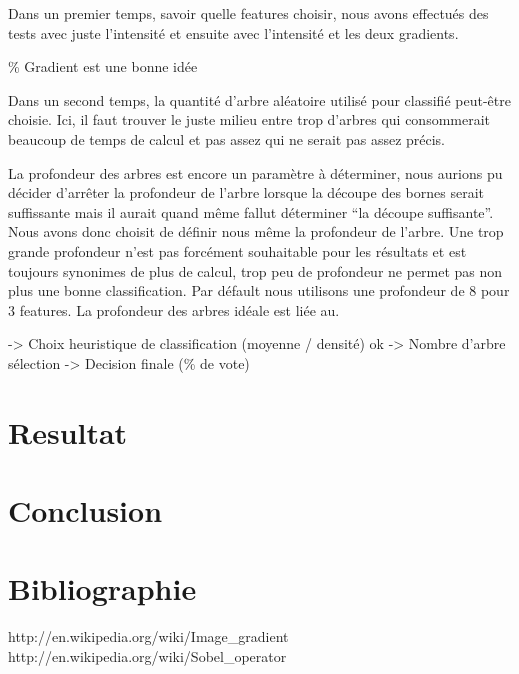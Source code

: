 \documentclass[11pt,a4paper]{report}
\begin{document}
Dans un premier temps, savoir quelle features choisir, nous avons effectués des tests avec juste l'intensité et ensuite avec l'intensité et les deux gradients. 

\% Gradient est une bonne idée

Dans un second temps, la quantité d'arbre aléatoire utilisé pour classifié peut-être choisie. Ici, il faut trouver le juste milieu entre trop d'arbres qui consommerait beaucoup de temps de calcul et pas assez qui ne serait pas assez précis.

La profondeur des arbres est encore un paramètre à déterminer, nous aurions pu décider d'arrêter la profondeur de l'arbre lorsque la découpe des bornes serait suffissante mais il aurait quand même fallut déterminer ``la découpe suffisante''. Nous avons donc choisit de définir nous même la profondeur de l'arbre. Une trop grande profondeur n'est pas forcément souhaitable pour les résultats et est toujours synonimes de plus de calcul, trop peu de profondeur ne permet pas non plus une bonne classification. Par défault nous utilisons une profondeur de 8 pour 3 features. La profondeur des arbres idéale est liée au.

-> Choix heuristique de classification (moyenne / densité)  ok 
-> Nombre d'arbre sélection
-> Decision finale (\% de vote)

\section{Resultat}

\section{Conclusion}
	
	
\section{Bibliographie}	
\begin{thebibliography}{2}
    http://en.wikipedia.org/wiki/Image\_gradient
    http://en.wikipedia.org/wiki/Sobel\_operator
  
\end{thebibliography}
\end{document}
